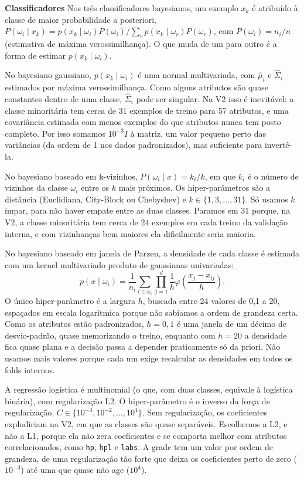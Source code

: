 \documentclass[12pt,reqno]{amsart}
\begin{document}
\noindent \textbf{Classificadores}
Nos três classificadores bayesianos, um exemplo $x_k$ é atribuído à classe de maior
probabilidade a posteriori,
$P(\omega_i\mid x_k)=p(x_k\mid\omega_i)P(\omega_i)/\sum_{r}p(x_k\mid\omega_r)P(\omega_r)$, com
$P(\omega_i)=n_i/n$ (estimativa de máxima verossimilhança). O que muda de um para outro é a
forma de estimar $p(x_k\mid\omega_i)$.

No bayesiano gaussiano, $p(x_k\mid\omega_i)$ é uma normal multivariada, com $\hat\mu_i$ e
$\hat\Sigma_i$ estimados por máxima verossimilhança. Como alguns atributos são quase constantes
dentro de uma classe, $\hat\Sigma_i$ pode ser singular. Na V2 isso é inevitável: a classe
minoritária tem cerca de 31 exemplos de treino para 57 atributos, e uma covariância estimada com
menos exemplos do que atributos nunca tem posto completo. Por isso somamos $10^{-3}I$ à matriz,
um valor pequeno perto das variâncias (da ordem de 1 nos dados padronizados), mas suficiente para
invertê-la.

No bayesiano baseado em k-vizinhos, $P(\omega_i\mid x)=k_i/k$, em que $k_i$ é o número de
vizinhos da classe $\omega_i$ entre os $k$ mais próximos. Os hiper-parâmetros são a distância
(Euclidiana, City-Block ou Chebyshev) e $k\in\{1,3,\dots,31\}$. Só usamos $k$ ímpar, para não
haver empate entre as duas classes. Paramos em 31 porque, na V2, a classe minoritária tem cerca
de 24 exemplos em cada treino da validação interna, e com vizinhanças bem maiores ela
dificilmente seria maioria.

No bayesiano baseado em janela de Parzen, a densidade de cada classe é estimada com um kernel
multivariado produto de gaussianas univariadas:
\[
p(x\mid\omega_i)=\frac{1}{n_i}\sum_{l\in\omega_i}\prod_{j=1}^{d}\frac{1}{h}\varphi\!\left(\frac{x_j-x_{lj}}{h}\right).
\]
O único hiper-parâmetro é a largura $h$, buscada entre 24 valores de 0,1 a 20, espaçados em
escala logarítmica porque não sabíamos a ordem de grandeza certa. Como os atributos estão
padronizados, $h=0{,}1$ é uma janela de um décimo de desvio-padrão, quase memorizando o treino,
enquanto com $h=20$ a densidade fica quase plana e a decisão passa a depender praticamente só da
priori. Não usamos mais valores porque cada um exige recalcular as densidades em todos os folds
internos.

A regressão logística é multinomial (o que, com duas classes, equivale à logística binária), com
regularização L2. O hiper-parâmetro é o inverso da força de regularização,
$C\in\{10^{-3},10^{-2},\dots,10^{4}\}$. Sem regularização, os coeficientes explodiriam na V2, em
que as classes são quase separáveis. Escolhemos a L2, e não a L1, porque ela não zera
coeficientes e se comporta melhor com atributos correlacionados, como \texttt{hp}, \texttt{hpl}
e \texttt{labs}. A grade tem um valor por ordem de grandeza, de uma regularização tão forte que
deixa os coeficientes perto de zero ($10^{-3}$) até uma que quase não age ($10^{4}$).
\end{document}
